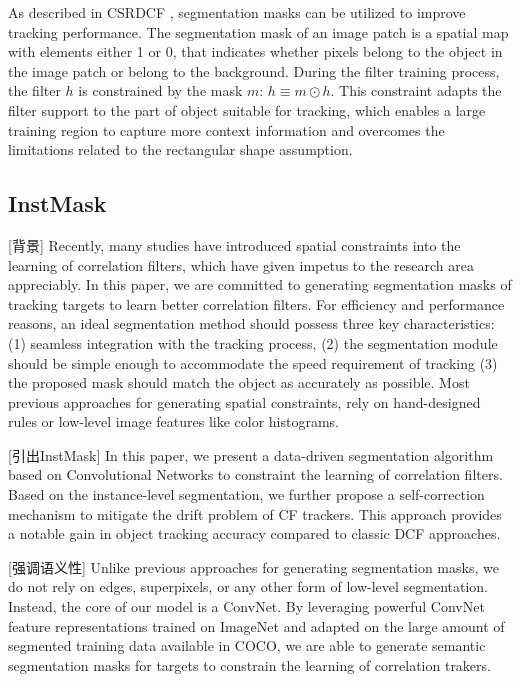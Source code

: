 \documentclass[review]{elsarticle}
\begin{document}
\begin{CJK*}{UTF8}{gbsn}
As described in CSRDCF \cite{Lukezic2017DiscriminativeCF}, segmentation masks can be utilized to improve tracking performance. The segmentation mask of an image patch is a spatial map with elements either 1 or 0, that indicates whether pixels belong to the object in the image patch or belong to the background. During the filter training process, the filter $h$ is constrained by the mask $m$: $h \equiv m \odot h$. This constraint adapts the filter support to the part of object suitable for tracking, which enables a large training region to capture more context information and overcomes the limitations related to the rectangular shape assumption.

\subsection{InstMask}
[背景] Recently, many studies \cite{Danelljan2015LearningSR, Lukezic2017DiscriminativeCF, Galoogahi2017LearningBC, Xu2018LearningAD, Feng2018LearningSR} have introduced spatial constraints into the learning of correlation filters, which have given impetus to the research area appreciably. In this paper, we are committed to generating segmentation masks of tracking targets to learn better correlation filters. For efficiency and performance reasons, an ideal segmentation method should possess three key characteristics: (1) seamless integration with the tracking process, (2) the segmentation module should be simple enough to accommodate the speed requirement of tracking (3) the proposed mask should match the object as accurately as possible.
Most previous approaches for generating spatial constraints, rely on hand-designed rules or low-level image features like color histograms.

[引出InstMask]  In this paper, we present a data-driven segmentation algorithm based on Convolutional Networks to constraint the learning of correlation filters. Based on the instance-level segmentation, we further propose a self-correction mechanism to mitigate the drift problem of CF trackers. This approach provides a notable gain in object tracking accuracy compared to classic DCF approaches.

[强调语义性] Unlike previous approaches for generating segmentation masks, we do not rely on edges, superpixels, or any other form of low-level segmentation. Instead, the core of our model is a ConvNet. By leveraging powerful ConvNet feature representations trained on ImageNet and adapted on the large amount of segmented training data available in COCO, we are able to generate semantic segmentation masks for targets to constrain the learning of correlation trakers.


\end{CJK*}
\end{document}
